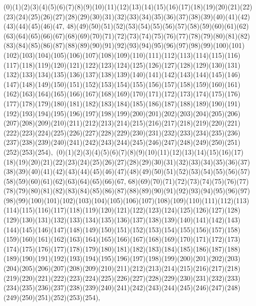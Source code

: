 \documentclass[12pt]{article}
\begin{document}
{(0)(1)(2)(3)(4)(5)(6)(7)(8)(9)(10)(11)(12)(13)(14)(15)(16)(17)(18)(19)(20)(21)(22)(23)(24)(25)(26)(27)(28)(29)(30)(31)(32)(33)(34)(35)(36)(37)(38)(39)(40)(41)(42)(43)(44)(45)(46)(47, 48)(49)(50)(51)(52)(53)(54)(55)(56)(57)(58)(59)(60)(61)(62)(63)(64)(65)(66)(67)(68)(69)(70)(71)(72)(73)(74)(75)(76)(77)(78)(79)(80)(81)(82)(83)(84)(85)(86)(87)(88)(89)(90)(91)(92)(93)(94)(95)(96)(97)(98)(99)(100)(101)(102)(103)(104)(105)(106)(107)(108)(109)(110)(111)(112)(113)(114)(115)(116)(117)(118)(119)(120)(121)(122)(123)(124)(125)(126)(127)(128)(129)(130)(131)(132)(133)(134)(135)(136)(137)(138)(139)(140)(141)(142)(143)(144)(145)(146)(147)(148)(149)(150)(151)(152)(153)(154)(155)(156)(157)(158)(159)(160)(161)(162)(163)(164)(165)(166)(167)(168)(169)(170)(171)(172)(173)(174)(175)(176)(177)(178)(179)(180)(181)(182)(183)(184)(185)(186)(187)(188)(189)(190)(191)(192)(193)(194)(195)(196)(197)(198)(199)(200)(201)(202)(203)(204)(205)(206)(207)(208)(209)(210)(211)(212)(213)(214)(215)(216)(217)(218)(219)(220)(221)(222)(223)(224)(225)(226)(227)(228)(229)(230)(231)(232)(233)(234)(235)(236)(237)(238)(239)(240)(241)(242)(243)(244)(245)(246)(247)(248)(249)(250)(251)(252)(253)(254)$
, 
$
(0)(1)(2)(3)(4)(5)(6)(7)(8)(9)(10)(11)(12)(13)(14)(15)(16)(17)(18)(19)(20)(21)(22)(23)(24)(25)(26)(27)(28)(29)(30)(31)(32)(33)(34)(35)(36)(37)(38)(39)(40)(41)(42)(43)(44)(45)(46)(47)(48)(49)(50)(51)(52)(53)(54)(55)(56)(57)(58)(59)(60)(61)(62)(63)(64)(65)(66)(67, 68)(69)(70)(71)(72)(73)(74)(75)(76)(77)(78)(79)(80)(81)(82)(83)(84)(85)(86)(87)(88)(89)(90)(91)(92)(93)(94)(95)(96)(97)(98)(99)(100)(101)(102)(103)(104)(105)(106)(107)(108)(109)(110)(111)(112)(113)(114)(115)(116)(117)(118)(119)(120)(121)(122)(123)(124)(125)(126)(127)(128)(129)(130)(131)(132)(133)(134)(135)(136)(137)(138)(139)(140)(141)(142)(143)(144)(145)(146)(147)(148)(149)(150)(151)(152)(153)(154)(155)(156)(157)(158)(159)(160)(161)(162)(163)(164)(165)(166)(167)(168)(169)(170)(171)(172)(173)(174)(175)(176)(177)(178)(179)(180)(181)(182)(183)(184)(185)(186)(187)(188)(189)(190)(191)(192)(193)(194)(195)(196)(197)(198)(199)(200)(201)(202)(203)(204)(205)(206)(207)(208)(209)(210)(211)(212)(213)(214)(215)(216)(217)(218)(219)(220)(221)(222)(223)(224)(225)(226)(227)(228)(229)(230)(231)(232)(233)(234)(235)(236)(237)(238)(239)(240)(241)(242)(243)(244)(245)(246)(247)(248)(249)(250)(251)(252)(253)(254)$
, 
$
}
\end{document}
